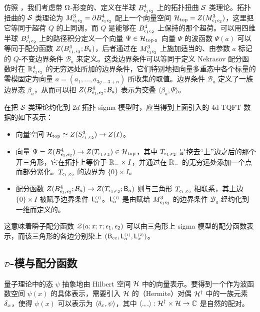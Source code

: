 仿照 \cite{NW}，我们考虑带 $\Omega$-形变的、定义在半球 $B_{\epsilon_1\epsilon_2}^4$ 上的拓扑扭曲 $\mathcal{S}$ 类理论。拓扑扭曲的 $\mathcal{S}$ 类理论为 $M^3_{\epsilon_1\epsilon_2}=\partial B^4_{\epsilon_1\epsilon_2}$ 配上一个向量空间 $\mathcal{H}_{\rm top}=Z(M^3_{\epsilon_1\epsilon_2})$，这里把它等同于超荷 $Q$ 的上同调，而 $Q$ 是能够在 $B_{\epsilon_1\epsilon_2}^4$ 上保持的那个超荷。可以用四维半球 $B_{\epsilon_1\epsilon_2}^4$ 上的路径积分定义一个向量 $\Psi \in\mathcal{H}_{\rm top}$。向量 $\Psi$ 的波函数 $\Psi(a)$ 可以等同于配分函数 $Z(B^4_{\epsilon_1,\epsilon_2};\mathcal{B}_a)$，后者通过在 $M^3_{\epsilon_1\epsilon_2}$ 上施加适当的、由参数 $a$ 标记的 $Q$-不变边界条件 $\mathcal{B}_a$ 来定义。这类边界条件可以等同于定义 Nekrasov 配分函数时在 $\mathbb{R}^4_{\epsilon_1\epsilon_2}$ 的无穷远处所加的边界条件，它们特别地把向量多重态中各个标量的零模固定为向量 $a=(a_1,\dots,a_{3g-3+n})$ 所收集的取值。边界条件 $\mathcal{B}_a$ 定义了一族边界态 $\beta_a$，从而可以把 $Z(B^4_{\epsilon_1,\epsilon_2};\mathcal{B}_a)$ 表示为交叠 $\langle\beta_a,\Psi\rangle$。

在把 $\mathcal{S}$ 类理论约化到 $2d$ 拓扑 sigma 模型时，应当得到上面引入的 4d TQFT 数据的如下表示：
\begin{itemize}
\item 向量空间 $\mathcal{H}_{\rm top}\simeq Z(S^3_{\epsilon_1,\epsilon_2})\to Z(I)$。
\item 向量 $\Psi=Z(B^4_{\epsilon_1,\epsilon_2})\to Z(T_{\epsilon_1,\epsilon_2})\in\mathcal{H}_{\rm top}$，其中 $T_{\epsilon_1,\epsilon_2}$ 是挖去“上”边之后的那个开三角形，它在拓扑上等价于 $\mathbb{R}_-\times I$，并通过在 $\mathbb{R}_-$ 的无穷远处添加一个点而部分紧化。$T_{\epsilon_1,\epsilon_2}$ 的边界为 $\{0\}\times I$。
\item 配分函数 $Z(B^4_{\epsilon_1,\epsilon_2};\mathcal{B}_a)\to Z(T_{\epsilon_1,\epsilon_2};\mathsf{B}_a)$ 则与三角形 $T_{\epsilon_1,\epsilon_2}$ 相联系，其上边 $\{0\}\times I$ 被赋予边界条件 $\mathsf{L}_{a}^{\scriptscriptstyle (1)}$。$\mathsf{L}_{a}^{\scriptscriptstyle (1)}$ 是由赋给 $M^3_{\epsilon_1\epsilon_2}$ 的边界条件 $\mathcal{B}_a$ 经约化到一维而定义的。
\end{itemize}
这意味着瞬子配分函数 $\mathcal{Z}(a;x;\tau;\epsilon_1,\epsilon_2)$ 可以由三角形上 sigma 模型的配分函数表示，而该三角形的各边分别染上 $(\mathsf{B}_{\rm cc}, \mathsf{L}_a^{\scriptscriptstyle (1)}, \mathsf{L}_x^{\scriptscriptstyle (2)})$。

\subsection{$\mathcal{D}$-模与配分函数}

量子理论中的态 $\psi$ 抽象地由 Hilbert 空间 $\mathcal{H}$ 中的向量表示。要得到一个作为波函数空间 $\psi(x)$ 的具体表示，需要引入 $\mathcal{H}$ 的（Hermite）对偶 $\mathcal{H}^\dagger$ 中的一族元素 $\delta_x$，使得 $\psi(x)$ 可以表示为 $\langle\delta_x,\psi\rangle$，其中 $\langle . , .\rangle:\mathcal{H}^{\dagger}\times\mathcal{H}\to \mathbb{C}$ 是自然的配对。

